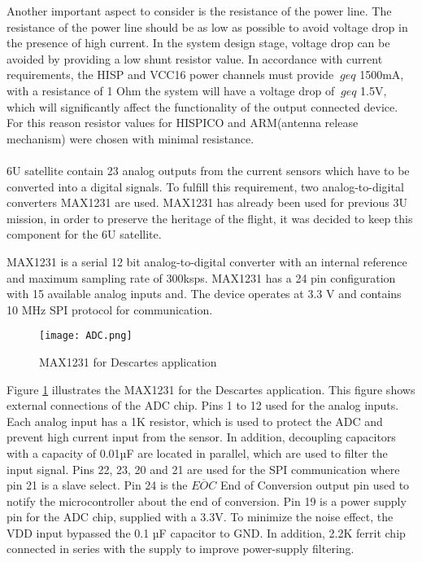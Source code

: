   \label{Tab:res}
 Another important aspect to consider is the resistance of the power line. The resistance of the power line should be as low as possible to avoid voltage drop in the presence of high current. In the system design stage, voltage drop can be avoided by providing a low shunt resistor value. In accordance with current requirements, the HISP and VCC16 power channels must provide $ \ geq $ 1500mA, with a resistance of 1 Ohm the system will have a voltage drop of $ \ geq $ 1.5V, which will significantly affect the functionality of the output connected device.
 For this reason resistor values for HISPICO and ARM(antenna release mechanism) were chosen with minimal resistance.\\ \\ 
 
 6U satellite contain 23 analog outputs from the current sensors which have to be converted into a digital signals. To fulfill this requirement, two analog-to-digital converters MAX1231 are used. MAX1231 has already been used for previous 3U mission, in order to preserve the heritage of the flight, it was decided to keep this component for the 6U satellite.
 
  \cite{25}MAX1231 is a serial 12 bit  analog-to-digital converter with an internal reference and maximum sampling rate of 300ksps. MAX1231 has a 24 pin configuration with 15 available analog inputs and. The device operates at 3.3 V and contains 10 MHz SPI protocol for communication.
  
   \begin{figure}[h]
   	\centering
   	\texttt{[image: ADC.png]}
   	\caption{MAX1231 for Descartes application}
   	\label{fig: adc}
   \end{figure} 
 
  Figure \ref{fig: adc} illustrates the MAX1231 for the Descartes application. This figure shows external connections of the ADC chip. Pins 1 to 12 used for the analog inputs. Each analog input has a 1K resistor, which is used to protect the ADC and prevent high current input from the sensor. In addition, decoupling capacitors with a capacity of 0.01µF are located in parallel, which are used to filter the input signal. Pins 22, 23, 20 and 21 are used for the SPI communication where pin 21 is a slave select. Pin 24 is the $\overline{EOC}$ End of Conversion output pin used to notify the microcontroller about the end of conversion. Pin 19 is a power supply pin for the ADC chip, supplied with a 3.3V. To minimize the noise effect, the VDD input bypassed the 0.1 µF capacitor to GND. In addition, 2.2K ferrit chip connected in series with the supply to improve power-supply filtering. 
 
